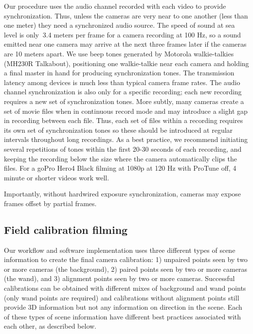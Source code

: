 \documentclass[fleqn,10pt]{wlpeerj}
\begin{document}
Our procedure uses the audio channel recorded with each video to provide synchronization. Thus, unless the cameras are very near to one another (less than one meter) they need a synchronized audio source.  The speed of sound at sea level is only $~$3.4 meters per frame for a camera recording at 100 Hz, so a sound emitted near one camera may arrive at the next three frames later if the cameras are 10 meters apart. We use beep tones generated by Motorola walkie-talkies (MH230R Talkabout), positioning one walkie-talkie near each camera and holding a final master in hand for producing synchronization tones. The transmission latency among devices is much less than typical camera frame rates. The audio channel synchronization is also only for a specific recording; each new recording requires a new set of synchronization tones.  More subtly, many cameras create a set of movie files when in continuous record mode and may introduce a slight gap in recording between each file. Thus, each set of files within a recording requires its own set of synchronization tones so these should be introduced at regular intervals throughout long recordings.
As a best practice, we recommend initiating several repetitions of tones within the first 20-30 seconds of each recording, and keeping the recording below the size where the camera automatically clips the files.  For a goPro Hero4 Black filming at 1080p at 120 Hz with ProTune off, 4 minute or shorter videos work well.

Importantly, without hardwired exposure synchronization, cameras may expose frames offset by partial frames.    
 
\subsection*{Field calibration filming}
Our workflow and software implementation uses three different types of scene information to create the final camera calibration: 1) unpaired points seen by two or more cameras (the background), 2) paired points seen by two or more cameras (the wand), and 3) alignment points seen by two or more cameras. Successful calibrations can be obtained with different mixes of background and wand points (only wand points are required) and calibrations without alignment points still provide 3D information but not any information on direction in the scene. Each of these types of scene information have different best practices associated with each other, as described below.
\end{document}
